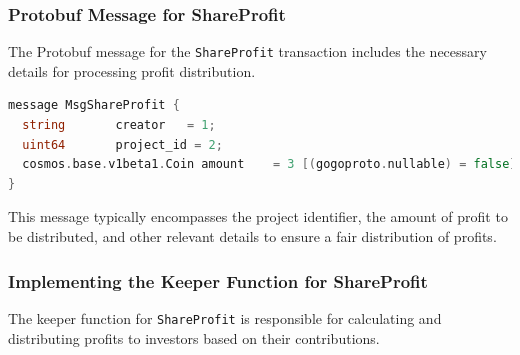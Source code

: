 \subsubsection{Protobuf Message for ShareProfit}
\label{subsubsec:protobuf-share-profit}

The Protobuf message for the \texttt{ShareProfit} transaction includes the necessary details for processing profit distribution.

\begin{lstlisting}[language=go, caption=ShareProfit protobuf definition, label={lst:share_profit_proto}]
message MsgShareProfit {
  string       creator   = 1;
  uint64       project_id = 2;
  cosmos.base.v1beta1.Coin amount    = 3 [(gogoproto.nullable) = false];
}
\end{lstlisting}

This message typically encompasses the project identifier, the amount of profit to be distributed, and other relevant details to ensure a fair distribution of profits.

\subsubsection{Implementing the Keeper Function for ShareProfit}
\label{subsubsec:keeper-share-profit}

The keeper function for \texttt{ShareProfit} is responsible for calculating and distributing profits to investors based on their contributions.

